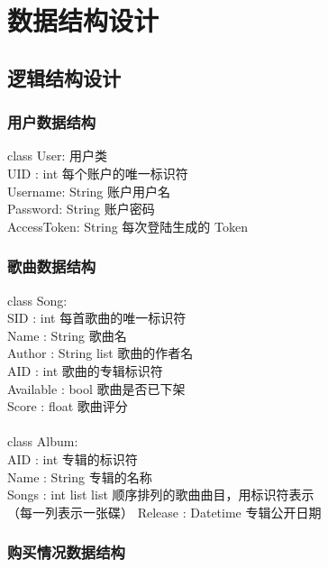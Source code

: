 \chapter{数据结构设计}
\section{逻辑结构设计}
\subsection{用户数据结构}

class User:             用户类\\
\indent \indent    UID : int           每个账户的唯一标识符\\
\indent \indent    Username: String    账户用户名\\
\indent \indent    Password: String    账户密码\\
\indent \indent    AccessToken: String 每次登陆生成的 Token

\subsection{歌曲数据结构}

class Song:\\
\indent \indent   SID : int           每首歌曲的唯一标识符\\
\indent \indent   Name : String       歌曲名\\
\indent \indent   Author : String list 歌曲的作者名\\
\indent \indent   AID : int           歌曲的专辑标识符\\
\indent \indent   Available : bool    歌曲是否已下架\\
\indent \indent   Score : float       歌曲评分\\
\\
class Album:\\
\indent \indent    AID : int           专辑的标识符\\
\indent \indent    Name : String       专辑的名称\\
\indent \indent    Songs : int list list   顺序排列的歌曲曲目，用标识符表示\\
\indent \indent                            （每一列表示一张碟）
\indent \indent    Release : Datetime  专辑公开日期

\subsection{购买情况数据结构}

